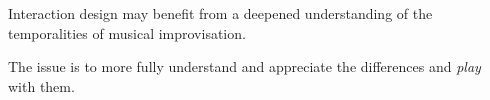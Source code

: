 \documentclass[]{beamer}
\begin{document}
\begin{frame}
  \frametitle{}
  \begin{block}{}
    \begin{center}
      Interaction design may benefit from a deepened understanding of the
      temporalities of musical improvisation.
    \end{center}
  \end{block}
  \pause[2]
  \begin{block}{}
    \begin{center}
      The issue is to more fully understand and appreciate the differences and
      \emph{play} with them.
    \end{center}
  \end{block}
\end{frame}
\end{document}
